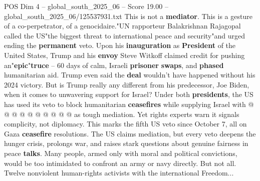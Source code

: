 \begin{textsample}{POS Dim 4 – global\_south\_2025\_06 – Score 19.00 – global\_south\_2025\_06/125537931.txt}
This is not a \textbf{mediator}.
This is a gesture of a co-perpetrator, of a genocidaire."UN rapporteur Balakrishnan Rajagopal called the US"the biggest threat to international peace and security"and urged ending the \textbf{permanent} veto.
Upon his \textbf{inauguration} as \textbf{President} of the United States, Trump and his \textbf{envoy} Steve Witkoff claimed credit for pushing an"\textbf{epic}"\textbf{truce} -- 60 days of calm, Israeli \textbf{prisoner} \textbf{swaps}, and \textbf{phased} humanitarian aid.
Trump even said the \textbf{deal} wouldn't have happened without his 2024 victory.
But is Trump really any different from his predecessor, Joe Biden, when it comes to unwavering support for Israel?
Under both \textbf{presidents}, the US has used its veto to block humanitarian \textbf{ceasefires} while supplying Israel with @ @ @ @ @ @ @ @ @ @ as tough mediation.
Yet rights experts warn it signals complicity, not diplomacy.
This marks the fifth US veto since October 7, all on Gaza \textbf{ceasefire} resolutions.
The US claims mediation, but every veto deepens the hunger crisis, prolongs war, and raises stark questions about genuine fairness in peace \textbf{talks}.
Many people, armed only with moral and political convictions, would be too intimidated to confront an army or navy directly.
But not all.
Twelve nonviolent human-rights activists with the international Freedom...

\end{textsample}
